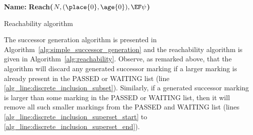 \begin{algorithm}[p]
\textbf{Name:} \textbf{Reach($N, (\place{0}, \age{0}), \EF \psi$)}\;
\caption{Reachability algorithm\label{alg:reachability}}  
\end{algorithm}
The successor generation algorithm is presented in 
Algorithm~\ref{alg:simple_successor_generation} and the reachability 
algorithm is given in Algorithm~\ref{alg:reachability}.
Observe, as remarked above, that the algorithm will discard any generated successor marking if a larger marking is already present in the PASSED or WAITING list (line \ref{alg_line:discrete_inclusion_subset}). Similarly, if a generated successor marking is larger than some marking in the PASSED or WAITING list, then it will remove all such smaller markings from the PASSED and WAITING list (lines \ref{alg_line:discrete_inclusion_superset_start} to \ref{alg_line:discrete_inclusion_superset_end}). 



